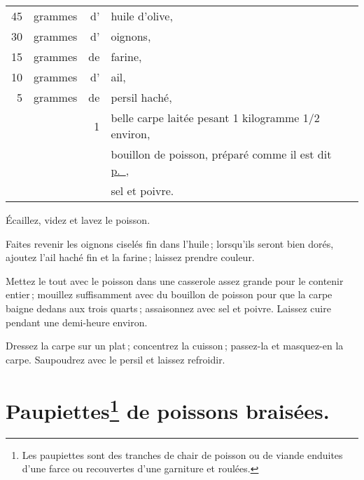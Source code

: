 \footnotesize
\begin{longtable}{rrrp{16em}}
     45 & grammes & d' & huile d'olive,                                                                   \\
     30 & grammes & d' & oignons,                                                                         \\
     15 & grammes & de & farine,                                                                          \\
     10 & grammes & d' & ail,                                                                             \\
      5 & grammes & de & persil haché,                                                                    \\
        &         &  1 & belle carpe laitée pesant 1 kilogramme 1/2 environ,                              \\
        &         &    & bouillon de poisson, préparé comme il est dit 
                         \hyperlink{p0218}{p. \pageref{pg0218}},                                          \\
        &         &    & sel et poivre.                                                                   \\
\end{longtable}
\normalsize

Écaillez, videz et lavez le poisson.

Faites revenir les oignons ciselés fin dans l'huile ; lorsqu'ils seront bien dorés,
ajoutez l'ail haché fin et la farine ; laissez prendre couleur.

Mettez le tout avec le poisson dans une casserole assez grande pour le contenir
entier ; mouillez suffisamment avec du bouillon de poisson pour que la carpe
baigne dedans aux trois quarts ; assaisonnez avec sel et poivre. Laissez cuire
pendant une demi-heure environ.

Dressez la carpe sur un plat ; concentrez la cuisson ; passez-la et masquez-en
la carpe. Saupoudrez avec le persil et laissez refroidir.

\section*{\centering Paupiettes\footnote{Les paupiettes sont des tranches de
chair de poisson ou de viande enduites d'une farce ou recouvertes d'une
garniture et roulées.} de poissons braisées.}

